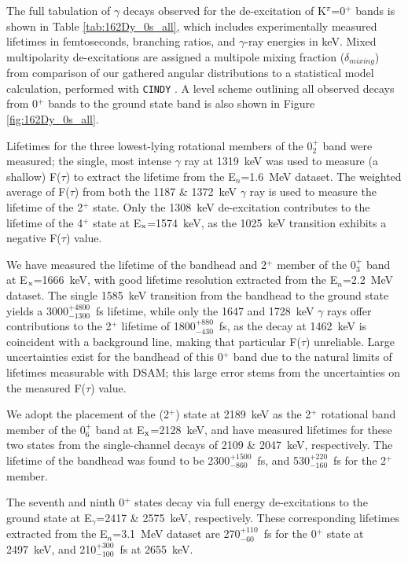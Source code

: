 The full tabulation of $\gamma$ decays observed for the de-excitation of K$^\pi$=0$^+$ bands is shown in Table \ref{tab:162Dy_0s_all}, which includes experimentally measured lifetimes in femtoseconds, branching ratios, and $\gamma$-ray energies in keV. Mixed multipolarity de-excitations are assigned a multipole mixing fraction ($\delta_{mixing}$) from comparison of our gathered angular distributions to a statistical model calculation, performed with {\tt CINDY} \cite{SHELDON197399}. A level scheme outlining all observed decays from 0$^+$ bands to the ground state band is also shown in Figure \ref{fig:162Dy_0s_all}.

Lifetimes for the three lowest-lying rotational members of the 0$^+_2$ band were measured; the single, most intense $\gamma$ ray at 1319~keV was used to measure (a shallow) F($\tau$) to extract the lifetime from the E$_n$=1.6~MeV dataset. The weighted average of F($\tau$) from both the 1187 \& 1372~keV $\gamma$ ray is used to measure the lifetime of the 2$^+$ state. Only the 1308~keV de-excitation contributes to the lifetime of the 4$^+$ state at E$_{\rm x}$=1574~keV, as the 1025~keV transition exhibits a negative F($\tau$) value.

We have measured the lifetime of the bandhead and 2$^+$ member of the 0$^+_3$ band at E$_{\rm x}$=1666~keV, with good lifetime resolution extracted from the E$_n$=2.2~MeV dataset. The single 1585~keV transition from the bandhead to the ground state yields a 3000$^{+4800}_{-1300}$~fs lifetime, while only the 1647 and 1728~keV $\gamma$ rays offer contributions to the 2$^+$ lifetime of 1800$^{+880}_{-430}$~fs, as the decay at 1462~keV is coincident with a background line, making that particular F($\tau$) unreliable. Large uncertainties exist for the bandhead of this 0$^+$ band due to the natural limits of lifetimes measurable with DSAM; this large error stems from the uncertainties on the measured F($\tau$) value.

We adopt the placement \cite{BERZINS1995413} of the (2$^+$) state at 2189~keV as the 2$^+$ rotational band member of the 0$^+_6$ band at E$_{\rm x}$=2128~keV, and have measured lifetimes for these two states from the single-channel decays of 2109 \& 2047~keV, respectively. The lifetime of the bandhead was found to be 2300$^{+1500}_{-860}$~fs, and 530$^{+220}_{-160}$~fs for the 2$^+$ member.

The seventh and ninth 0$^+$ states decay via full energy de-excitations to the ground state at E$_\gamma$=2417 \& 2575~keV, respectively. These corresponding lifetimes extracted from the E$_n$=3.1~MeV dataset are 270$^{+110}_{-60}$~fs for the 0$^+$ state at 2497~keV, and 210$^{+300}_{-100}$~fs at 2655~keV. 

